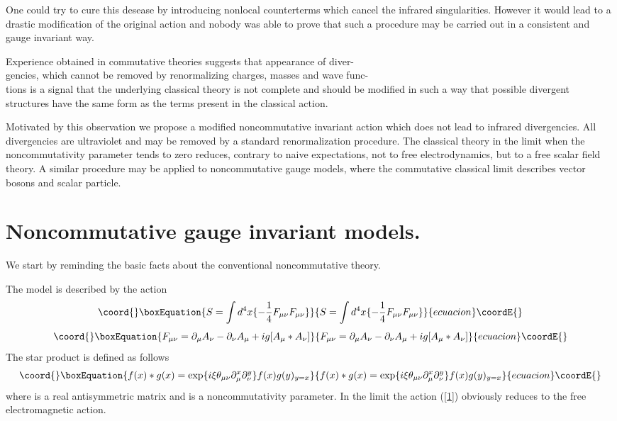 \documentclass[a4paper,12pt]{article}
\begin{document}
One could try to cure this desease by introducing nonlocal counterterms
which cancel the infrared singularities. However it would
lead to a drastic modification of the original action and nobody was able
to prove that such a procedure may be carried out in a consistent and
gauge invariant way.

Experience obtained in commutative theories suggests that appearance of
diver-\\gencies, which cannot be removed by renormalizing charges, masses
and wave func-\\tions is a signal that the underlying classical theory is
not complete and should be modified in such a way that possible divergent
structures have the same form as the terms present in the classical
action.

Motivated by this observation we propose a modified noncommutative \coordHE{}
invariant action which does not lead to infrared divergencies. All
divergencies are ultraviolet and may be removed by a standard
renormalization procedure. The classical theory in the limit
when the noncommutativity parameter \myHighlight{$(\xi)$}\coordHE{} tends to zero
 reduces, contrary to naive
expectations, not to free electrodynamics, but to a free scalar field
theory. A similar procedure may be applied to \coordHE{} noncommutative gauge
models, where the commutative classical limit describes \coordHE{}
vector bosons and \coordHE{} scalar particle.

\section{Noncommutative gauge invariant models.}

We start by reminding the basic facts about the conventional
noncommutative \coordHE{} theory.

The model is described by the action
\begin{equation}\coord{}\boxEquation{
S= \int d^4x \{- \frac{1}{4}F_{\mu \nu}F_{\mu \nu} \}
\label{1}
}{
S= \int d^4x \{- \frac{1}{4}F_{\mu \nu}F_{\mu \nu} \}
}{ecuacion}\coordE{}\end{equation}
\begin{equation}\coord{}\boxEquation{
F_{\mu \nu}= \partial_{\mu}A_{\nu}- \partial_{\nu}A_{\mu}+ig[A_{\mu}*
 A_{\nu}]
\label{2}
}{
F_{\mu \nu}= \partial_{\mu}A_{\nu}- \partial_{\nu}A_{\mu}+ig[A_{\mu}*
 A_{\nu}]
}{ecuacion}\coordE{}\end{equation}
The star product is defined as follows
\begin{equation}\coord{}\boxEquation{
f(x)* g(x)= \exp \{i \xi \theta_{\mu \nu} \partial_{\mu}^x
 \partial_{\nu}^y \}f(x)g(y)_{y=x}
\label{3}
}{
f(x)* g(x)= \exp \{i \xi \theta_{\mu \nu} \partial_{\mu}^x
 \partial_{\nu}^y \}f(x)g(y)_{y=x}
}{ecuacion}\coordE{}\end{equation}
where \myHighlight{$\theta_{\mu \nu}$}\coordHE{} is a real antisymmetric matrix and \myHighlight{$\xi$}\coordHE{} is a
 noncommutativity parameter. In the limit \coordHE{} the action
 (\ref{1}) obviously reduces to the free electromagnetic action.
\end{document}
